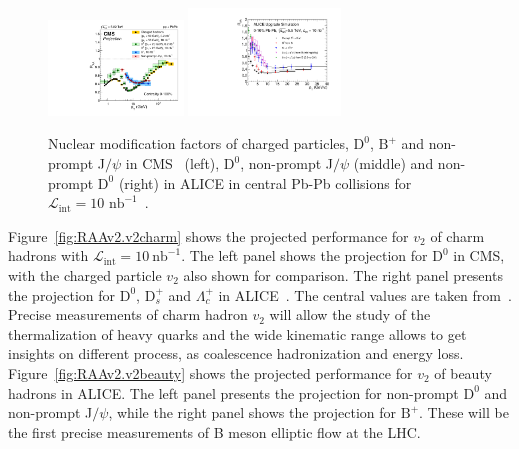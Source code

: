 \begin{figure}[ht]
  \begin{center}
    \includegraphics[width=0.32\textwidth]{hf/figures/cRAA_lumiTG_10_lumiMB_0_v2_right.pdf}
   \includegraphics[width=0.36\textwidth]{hf/figures/ALICEUpgrade_charmbeautyRAA.pdf}
    \caption{Nuclear modification factors of charged particles, $\mathrm{D}^{0}$, $\mathrm{B}^{+}$ and non-prompt J$/\psi$ in CMS~\cite{CMS-PAS-FTR-17-002} (left), $\mathrm{D}^{0}$, non-prompt J$/\psi$ (middle) and non-prompt $\mathrm{D}^{0}$ (right) in ALICE in central Pb-Pb collisions for $\mathcal{L}_{\mathrm{int}}=10$ $\mathrm{nb}^{-1}$~\cite{Abelev:1625842}.}
    \label{fig:RAAv2.RAA}
  \end{center}
\end{figure}


Figure~\ref{fig:RAAv2.v2charm} shows the projected performance for $v_{2}$ of charm hadrons with $\mathcal{L}_{\mathrm{int}}=10~\mathrm{nb}^{-1}$. The left panel shows the projection for $\mathrm{D}^{0}$ in CMS, with the charged particle $v_{2}$ also shown for comparison. The right panel presents the projection for $\mathrm{D}^{0}$, $\mathrm{D}_{s}^{+}$ and $\Lambda_{c}^{+}$ in ALICE~\cite{Abelev:1625842}. The central values are taken from~\cite{v2charmtheory}. Precise measurements of charm hadron $v_{2}$ will allow the study of the thermalization of heavy quarks and the wide kinematic range allows to get insights on different process, as coalescence hadronization and energy loss. Figure~\ref{fig:RAAv2.v2beauty} shows the projected performance for $v_{2}$ of beauty hadrons in ALICE. The left panel presents the projection for non-prompt $\mathrm{D}^{0}$ and non-prompt J$/\psi$, while the right panel shows the projection for $\mathrm{B}^{+}$. These will be the first precise measurements of B meson elliptic flow at the LHC.

